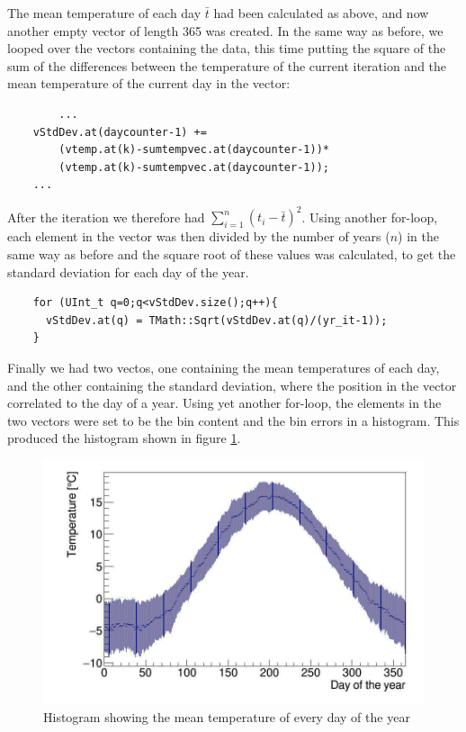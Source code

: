 \documentclass[a4paper,12pt,twoside]{article}
\begin{document}
 The mean temperature of each day $\bar{t}$ had been calculated as above, and now another 
 empty vector of length 365 was created. In the same way as before, we looped over the vectors
 containing the data, this time putting the square of the sum of the differences between the
 temperature of the current iteration and the mean temperature of the current day in the vector:
 
 \begin{verbatim}
    	...
  	vStdDev.at(daycounter-1) +=
  	    (vtemp.at(k)-sumtempvec.at(daycounter-1))*
  	    (vtemp.at(k)-sumtempvec.at(daycounter-1));
  	...
 \end{verbatim}

 
 After the iteration we therefore had ${\sum\limits_{i=1}^{n} (t_i - \bar{t})}^2$. Using another for-loop, each element in the vector
 was then divided by the number of years ($n$) in the same way as before and the square root of these values was
 calculated, to get the standard deviation for each day of the year.
 
 \begin{verbatim}
	for (UInt_t q=0;q<vStdDev.size();q++){
	  vStdDev.at(q) = TMath::Sqrt(vStdDev.at(q)/(yr_it-1));
	}
 \end{verbatim}
 
 Finally we had two vectos, one containing the mean temperatures of each day, and the other
 containing the standard deviation, where the position in the vector correlated to the day
 of a year. Using yet another for-loop, the elements in the two vectors were set to be the
 bin content and the bin errors in a histogram. This produced the histogram shown in
 figure \ref{fig:tempPerDay}.
 
 \begin{figure}[htb]
  \begin{center}
   \includegraphics[width=13cm]{../Code/tempPerDay.jpg}
   \caption{Histogram showing the mean temperature of every day of the year}
   \label{fig:tempPerDay}
  \end{center}
 \end{figure}
 
\end{document}
